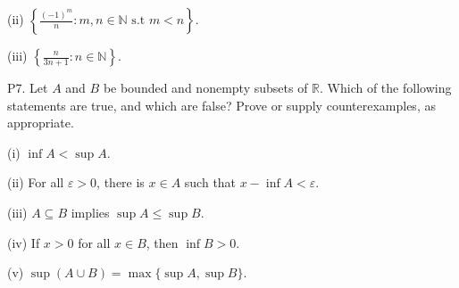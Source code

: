 \documentclass[letterpaper,10pt,english]{jupyterBook}
\begin{document}
\sphinxAtStartPar
(ii) \(\left\{\frac{(-1)^m}{n}:m,n\in\mathbb{N} \text{ s.t } m<n\right\}\).

\sphinxAtStartPar
(iii) \(\left\{\frac{n}{3n + 1} :n\in\mathbb{N}\right\}\).


\label{\detokenize{Problems:p7}}
\sphinxAtStartPar
P7. Let \(A\) and \(B\) be bounded and non\sphinxhyphen{}empty subsets of \(\mathbb{R}\). Which of the following statements are true, and which are false? Prove or supply counter\sphinxhyphen{}examples, as appropriate.

\sphinxAtStartPar
(i) \(\inf A < \sup A\).

\sphinxAtStartPar
(ii) For all \(\varepsilon>0\), there is \(x\in A\) such that \(x-\inf A < \varepsilon\).

\sphinxAtStartPar
(iii) \(A\subseteq B\) implies \(\sup A \leq \sup B\).

\sphinxAtStartPar
(iv) If \(x>0\) for all \(x\in B\), then \(\inf B >0\).

\sphinxAtStartPar
(v) \(\sup(A\cup B) = \max\{\sup A,\sup B\}\).
\end{document}
